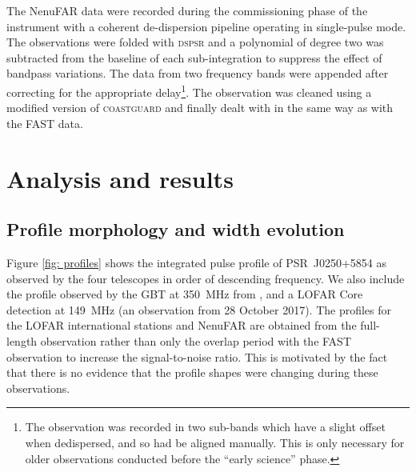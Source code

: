 The NenuFAR data were recorded during the commissioning phase of the instrument with a coherent de-dispersion pipeline \citep[LUPPI;][]{BGT+2020} operating in single-pulse mode. The observations were folded with \textsc{dspsr} and a polynomial of degree two was subtracted from the baseline of each sub-integration to suppress the effect of bandpass variations. The data from two frequency bands were appended after correcting for the appropriate delay\footnote{The observation was recorded in two sub-bands which have a slight offset when dedispersed, and so had be aligned manually. This is only necessary for older observations conducted before the ``early science'' phase.}. The observation was cleaned using a modified version of \textsc{coastguard} \citep{LKG+2016} and finally dealt with in the same way as with the FAST data.

\section{Analysis and results}
\label{sec: J0250 - analysis}

\subsection{Profile morphology and width evolution}
\label{sec: J0250 - analysis - profile widths}

Figure \ref{fig: profiles} shows the integrated pulse profile of PSR~J0250+5854 as observed by the four telescopes in order of descending frequency. We also include the profile observed by the GBT at 350~MHz from \citet{TBC+2018}, and a LOFAR Core detection at 149~MHz (an observation from 28 October 2017). The profiles for the LOFAR international stations and NenuFAR are obtained from the full-length observation rather than only the overlap period with the FAST observation to increase the signal-to-noise ratio. This is motivated by the fact that there is no evidence that the profile shapes were changing during these observations. 


